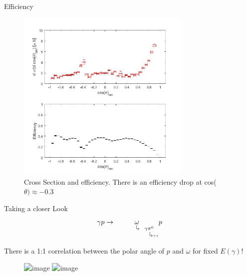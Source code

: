 \documentclass[
		10pt
		]{beamer}
\begin{document}
\begin{frame}{Efficiency}
	\centering
	\begin{figure}
		\includegraphics[width=8.3cm]{Plots/4}
		\captionsetup{labelformat=empty}
		\caption{Cross Section and efficiency. There is an efficiency drop at cos($\theta) \approx -0.3$}
	\end{figure}
\end{frame}

\begin{frame}{Taking a closer Look}
	\begin{equation*}
\gamma  p \rightarrow \underset{ \hspace{1.05cm}\rotatebox[origin=c]{180}{$\Lsh$}{\underset{\hspace{0.5cm}\rotatebox[origin=c]{180}{$\Lsh$} \gamma \gamma 	}{\gamma \pi^0}}}{\omega} p 
	\end{equation*}

There is a 1:1 correlation between the polar angle of $p$ and $\omega$ for fixed $E(\gamma)$!




		
			
			
	

 
\begin{figure}
	\centering
	\captionsetup{labelformat=empty}
	\includegraphics<1>[width=8.3cm]{Plots/5}
	\includegraphics<2>[width=8.3cm]{Plots/8}
\end{figure}



\end{frame}
\iffalse
\end{document}

